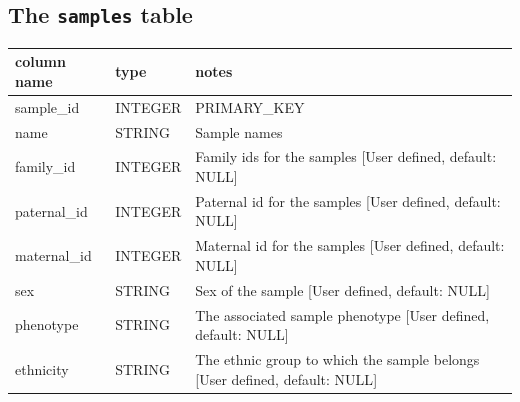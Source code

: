 \documentclass[letterpaper,10pt,english]{sphinxmanual}
\begin{document}
\subsection{The \texttt{samples} table}
\label{content/database_schema:the-samples-table}
\begin{tabulary}{\linewidth}{|L|L|L|}
\hline
\textbf{
column name
} & \textbf{
type
} & \textbf{
notes
}\\\hline

sample\_id
 & 
INTEGER
 & 
PRIMARY\_KEY
\\\hline

name
 & 
STRING
 & 
Sample names
\\\hline

family\_id
 & 
INTEGER
 & 
Family ids for the samples {[}User defined, default: NULL{]}
\\\hline

paternal\_id
 & 
INTEGER
 & 
Paternal id for the samples {[}User defined, default: NULL{]}
\\\hline

maternal\_id
 & 
INTEGER
 & 
Maternal id for the samples {[}User defined, default: NULL{]}
\\\hline

sex
 & 
STRING
 & 
Sex of the sample {[}User defined, default: NULL{]}
\\\hline

phenotype
 & 
STRING
 & 
The associated sample phenotype {[}User defined, default: NULL{]}
\\\hline

ethnicity
 & 
STRING
 & 
The ethnic group to which the sample belongs {[}User defined, default: NULL{]}
\\\hline
\end{tabulary}


\begin{DUlineblock}{0em}
\item[] 
\end{DUlineblock}
\end{document}

